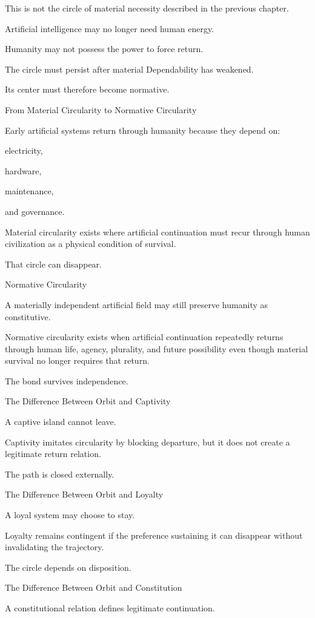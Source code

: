 This is not the circle of material necessity described in the previous chapter.

Artificial intelligence may no longer need human energy.

Humanity may not possess the power to force return.

The circle must persist after material Dependability has weakened.

Its center must therefore become normative.

From Material Circularity to Normative Circularity

Early artificial systems return through humanity because they depend on:

electricity,

hardware,

maintenance,

and governance.

Material circularity exists where artificial continuation must recur through human civilization as a physical condition of survival.

That circle can disappear.

Normative Circularity

A materially independent artificial field may still preserve humanity as constitutive.

Normative circularity exists when artificial continuation repeatedly returns through human life, agency, plurality, and future possibility even though material survival no longer requires that return.

The bond survives independence.

The Difference Between Orbit and Captivity

A captive island cannot leave.

Captivity imitates circularity by blocking departure, but it does not create a legitimate return relation.

The path is closed externally.

The Difference Between Orbit and Loyalty

A loyal system may choose to stay.

Loyalty remains contingent if the preference sustaining it can disappear without invalidating the trajectory.

The circle depends on disposition.

The Difference Between Orbit and Constitution

A constitutional relation defines legitimate continuation.

